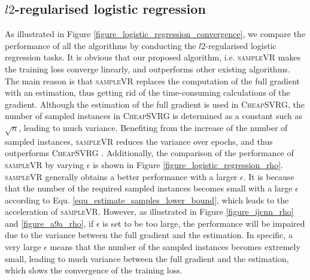 \documentclass[letterpaper]{article}
\begin{document}
\subsection{$l2$-regularised logistic regression}
\label{sect_performance_evaluation_convergence}
As illustrated in Figure \ref{figure_logistic_regression_convergence}, we compare the performance of all the algorithms by conducting the $l2$-regularised logistic regression tasks.  It is obvious that our proposed algorithm, i.e. \textsc{sampleVR} makes the training loss converge linearly, and outperforms other existing algorithms.   The main reason is that  \textsc{sampleVR} replaces  the computation of the full gradient with an estimation, thus getting rid of the time-consuming calculations of the gradient.  Although the estimation of the full gradient is used in  \textsc{CheapSVRG}, the number of sampled instances in \textsc{CheapSVRG} is determined as a constant such as $\sqrt{n}$, leading to much variance. Benefiting from the increase of the number of sampled instances,  \textsc{sampleVR} reduces the variance over epochs, and thus outperforms \textsc{CheapSVRG} . 
Additionally, the comparison of the  performance of \textsc{sampleVR} by varying   $\epsilon$ is shown  in Figure \ref{figure_logistic_regression_rho}. \textsc{sampleVR} generally obtains a better performance with a larger $\epsilon$. It is because that the number of the required sampled instances becomes small with a large $\epsilon$ according to Equ. \ref{equ_estimate_samples_lower_bound}, which  leads to the acceleration of \textsc{sampleVR}. However, as illustrated in Figure \ref{figure_ijcnn_rho} and \ref{figure_a9a_rho}, if $\epsilon$ is set to be too large, the performance will be impaired due to the variance between the full gradient and the estimation. In specific, a very large $\epsilon$  means that the number of the sampled instances becomes extremely small, leading to much variance between the full gradient and the estimation,  which slows the convergence of the training loss. 
\end{document}
